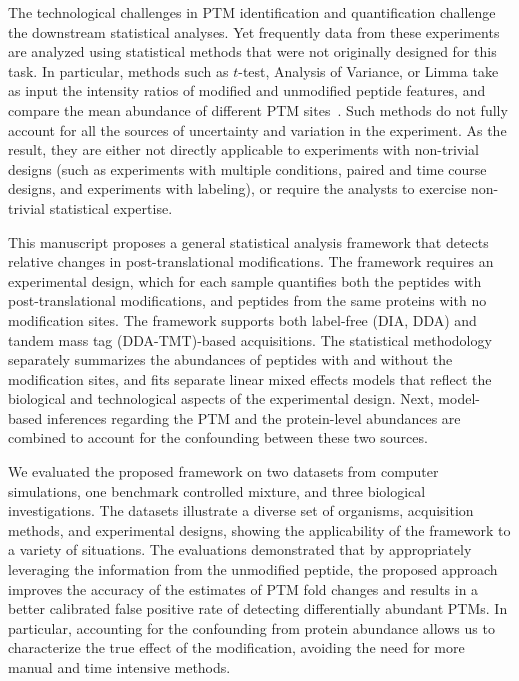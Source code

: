 \documentclass[mcp]{article}
\numberwithin{table}{section}
\begin{document}
The technological challenges in PTM identification and quantification challenge the downstream statistical analyses. Yet frequently data from these experiments are analyzed using statistical methods that were not originally designed for this task. In particular, methods such as $t$-test, Analysis of Variance, or Limma take as input the intensity ratios of modified and unmodified peptide features, and compare the mean abundance of different PTM sites~\cite{Ritchie_15a}. Such methods do not fully account for all the sources of uncertainty and variation in the experiment. As the result, they are either not directly applicable to experiments with non-trivial designs (such as experiments with multiple conditions, paired and time course designs, and experiments with labeling), or require the analysts to exercise non-trivial statistical expertise.

This manuscript proposes a general statistical analysis framework that detects relative changes in post-translational modifications. The framework requires an experimental design, which for each sample quantifies both the peptides with post-translational modifications, and peptides from the same proteins with no modification sites. The framework supports both label-free (DIA, DDA) and tandem mass tag (DDA-TMT)-based acquisitions. The statistical methodology separately summarizes the abundances of peptides with and without the modification sites, and fits separate linear mixed effects models that reflect the biological and technological aspects of the experimental design. Next, model-based inferences regarding the PTM and the protein-level abundances are combined to account for the confounding between these two sources.

We evaluated the proposed framework on two datasets from computer simulations, one benchmark controlled mixture, and three biological investigations. The datasets illustrate a diverse set of organisms, acquisition methods, and experimental designs, showing the applicability of the framework to a variety of situations. The evaluations demonstrated that by appropriately leveraging the information from the unmodified peptide, the proposed approach improves the accuracy of the estimates of PTM fold changes and results in a better calibrated false positive rate of detecting differentially abundant PTMs. In particular, accounting for the confounding from protein abundance allows us to characterize the true effect of the modification, avoiding the need for more manual and time intensive methods.
\end{document}
